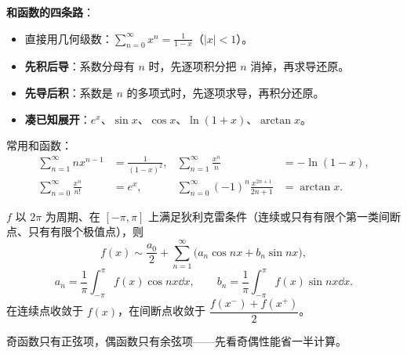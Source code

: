 \textbf{和函数的四条路}：
\begin{itemize}[leftmargin=1.6em,itemsep=1pt]
\item 直接用几何级数：$\displaystyle\sum_{n=0}^\infty x^n=\frac{1}{1-x}$（$|x|<1$）。
\item \textbf{先积后导}：系数分母有 $n$ 时，先逐项积分把 $n$ 消掉，再求导还原。
\item \textbf{先导后积}：系数是 $n$ 的多项式时，先逐项求导，再积分还原。
\item \textbf{凑已知展开}：$e^x$、$\sin x$、$\cos x$、$\ln(1+x)$、$\arctan x$。
\end{itemize}

常用和函数：
\begin{align*}
\sum_{n=1}^\infty nx^{n-1}&=\frac{1}{(1-x)^2}, &
\sum_{n=1}^\infty \frac{x^n}{n}&=-\ln(1-x),\\
\sum_{n=0}^\infty\frac{x^n}{n!}&=e^x, &
\sum_{n=0}^\infty(-1)^n\frac{x^{2n+1}}{2n+1}&=\arctan x .
\end{align*}




$f$ 以 $2\pi$ 为周期、在 $[-\pi,\pi]$ 上满足狄利克雷条件（连续或只有有限个第一类间断点、只有有限个极值点），则
\[
f(x)\sim\frac{a_0}{2}+\sum_{n=1}^\infty\bigl(a_n\cos nx+b_n\sin nx\bigr),
\]
\[
a_n=\frac1\pi\int_{-\pi}^{\pi}f(x)\cos nx\dd x,\qquad
b_n=\frac1\pi\int_{-\pi}^{\pi}f(x)\sin nx\dd x .
\]
在连续点收敛于 $f(x)$，在间断点收敛于 $\dfrac{f(x^-)+f(x^+)}{2}$。

奇函数只有正弦项，偶函数只有余弦项——先看奇偶性能省一半计算。

